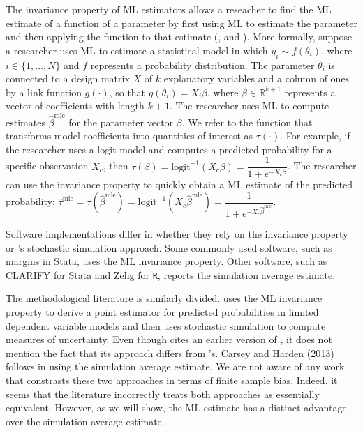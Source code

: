\documentclass[11pt]{article}
\begin{document}
The invariance property of ML estimators allows a reseacher to find the ML estimate of a function of a parameter by first using ML to estimate the parameter and then applying the function to that estimate (\citealt[pp. 75--76]{King1989}, and \citealt[pp. 320--321]{CasellaBerger2002}).
More formally, suppose a researcher uses ML to estimate a statistical model in which $y_i {\sim} f(\theta_i)$, where $i \in \{1,\ldots, N\}$ and $f$ represents a probability distribution. The parameter $\theta_i$ is connected to a design matrix $X$ of $k$ explanatory variables and a column of ones by a link function $g(\cdot)$, so that $g(\theta_i) = X_i\beta$, where $\beta \in \mathbb{R}^{k+1}$ represents a vector of coefficients with length $k + 1$.
The researcher uses ML to compute estimates $\hat{\beta}^{\text{mle}}$ for the parameter vector $\beta$. We refer to the function that transforms model coefficients into quantities of interest as $\tau(\cdot)$. For example, if the researcher uses a logit model and computes a predicted probability for a specific observation $X_c$, then $\tau(\beta) = \text{logit}^{-1}( X_c \beta) = \dfrac{1}{1 + e^{-X_c\beta}}$.
The researcher can use the invariance property to quickly obtain a ML estimate of the predicted probability: $\hat{\tau}^{\text{mle}} = \tau \left( \hat{\beta}^{\text{mle}}\right) = \text{logit}^{-1} \left( X_c \hat{\beta}^{\text{mle}} \right) = \dfrac{1}{1 + e^{-X_c \hat{\beta}^{\text{mle}}}}$.


Software implementations differ in whether they rely on the invariance property or \cite{KingTomzWittenberg2000}'s stochastic simulation approach. Some commonly used software, such as margins in Stata, uses the ML invariance property. Other software, such as CLARIFY for Stata and Zelig for \texttt{R}, reports the simulation average estimate.


The methodological literature is similarly divided. \cite{Herron1999} uses the ML invariance property to derive a point estimator for predicted probabilities in limited dependent variable models and then uses stochastic simulation to compute measures of uncertainty. Even though \cite{Herron1999} cites an earlier version of \cite{KingTomzWittenberg2000}, it does not mention the fact that its approach differs from \cite{KingTomzWittenberg2000}'s. Carsey and Harden (2013) follows \cite{KingTomzWittenberg2000} in using the simulation average estimate. We are not aware of any work that constrasts these two approaches in terms of finite sample bias. Indeed, it seems that the literature incorrectly treats both approaches as essentially equivalent. However, as we will show, the ML estimate has a distinct advantage over the simulation average estimate.
\end{document}
